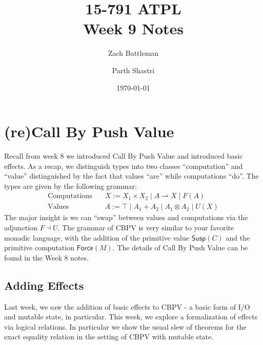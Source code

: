 \documentclass[letterpaper]{article}
\title{15-791 ATPL \\ Week 9 Notes}
\author{Zach Battleman \and Parth Shastri}
\date{\today}
\begin{document}
\maketitle
\section{(re)Call By Push Value}
    Recall from week 8 we introduced Call By Push Value and introduced basic effects. As a recap, we distinguish types into two classes ``computation'' and ``value'' distinguished by the fact that values ``are'' while computations ``do''. The types are given by the following grammar:
    \begin{align*}
        \text{Computations} \quad &X := X_1 \times X_2 \mid A \rightharpoonup X \mid F(A)\\
        \text{Values} \quad &A := \top \mid A_1 + A_2 \mid A_1 \otimes A_2 \mid U(X)
    \end{align*}
    The major insight is we can ``swap'' between values and computations via the adjunction $F \dashv U$. The grammar of CBPV is very similar to your favorite monadic language, with the addition of the primitive value $\mathsf{Susp}(C)$ and the primitive computation $\mathsf{Force}(M)$. The details of Call By Push Value can be found in the Week 8 notes.
\subsection{Adding Effects}
    Last week, we saw the addition of basic effects to CBPV - a basic form of I/O and mutable state, in particular. This week, we explore a formalization of effects via logical relations. In particular we show the usual slew of theorems for the exact equality relation in the setting of CBPV with mutable state.
\end{document}
